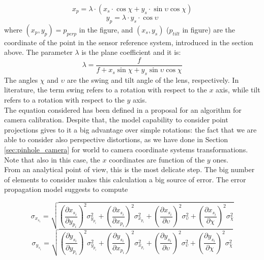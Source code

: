   \begin{equation*}
      x_p = \lambda \cdot \left( x_s \cdot \cos\chi + y_s \cdot \sin\upsilon\cos\chi \right)
  \end{equation*}
  \begin{equation*}
    y_p = \lambda \cdot y_s \cdot \cos\upsilon
  \end{equation*}
where $\left( x_p, y_p\right) = p_{perp}$ in the figure, and $\left( x_s, y_s\right)$ ($p_{tilt}$ in figure) are the coordinate of the point in the sensor reference system, introduced in the section above. The parameter $\lambda$ is the plane coefficient and it is:
  \begin{equation*}
    \lambda = \frac{f}{f + x_s \sin\chi + y_s \sin\upsilon\cos\chi}
  \end{equation*}
The angles $\chi$ and $\upsilon$ are the swing and tilt angle of the lens, respectively. In literature, the term swing refers to a rotation with respect to the $x$ axis, while tilt refers to a rotation with respect to the $y$ axis. \\

The equation considered has been defined in a proposal for an algorithm for camera calibration. Despite that, the model capability to consider point projections gives to it a big advantage over simple rotations: the fact that we are able to consider also perspective distortions, as we have done in Section \ref{sec:pinhole_camera} for world to camera coordinate systems transformations. Note that also in this case, the $x$ coordinates are function of the $y$ ones. \\

From an analytical point of view, this is the most delicate step. The big number of elements to consider makes this calculation a big source of error. The error propagation model suggests to compute

  \begin{equation*}
    \sigma_{x_{s_i}} = \sqrt{
      \left( \frac{\partial x_{s_i}}{\partial y_{p_i}} \right)^2 \sigma_{y_{p_i}}^2 +
      \left( \frac{\partial x_{s_i}}{\partial x_{p_i}} \right)^2 \sigma_{x_{p_i}}^2 +
      \left( \frac{\partial x_{s_i}}{\partial \upsilon} \right)^2 \sigma_\upsilon^2 +
      \left( \frac{\partial x_{s_i}}{\partial \chi} \right)^2 \sigma_\chi^2
    }
  \end{equation*}
  \begin{equation*}
    \sigma_{y_{s_i}} = \sqrt{
      \left( \frac{\partial y_{s_i}}{\partial y_{p_i}} \right)^2 \sigma_{y_{p_i}}^2 +
      \left( \frac{\partial y_{s_i}}{\partial x_{p_i}} \right)^2 \sigma_{x_{p_i}}^2 +
      \left( \frac{\partial y_{s_i}}{\partial \upsilon} \right)^2 \sigma_\upsilon^2 +
      \left( \frac{\partial y_{s_i}}{\partial \chi} \right)^2 \sigma_\chi^2
    }
  \end{equation*} \\
  
